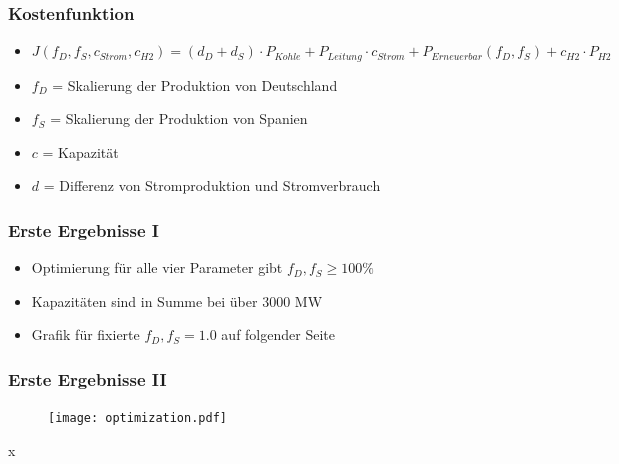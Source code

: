 \documentclass[aspectratio=169,t]{beamer}
\begin{document}
	\begin{frame}
		\frametitle{Kostenfunktion}
		\vspace*{2mm}
			\begin{minipage}{1\linewidth}
			\begin{minipage}{1\linewidth}
				\begin{itemize}
					\item \begin{math}
						J(f_D, f_S, c_{Strom}, c_{H2}) = (d_D + d_S) \cdot P_{Kohle} + P_{Leitung} \cdot c_{Strom} + P_{Erneuerbar}(f_D, f_S) + c_{H2} \cdot P_{H2}
					\end{math}
					\item 
					$	f_D$ = Skalierung der Produktion von Deutschland
					
					\item 
						$f_S$ = Skalierung der Produktion von Spanien
					\item 
					$	c$ = Kapazität
					\item 
					$	d$ = Differenz von Stromproduktion und  Stromverbrauch
				
					
				\end{itemize}
			\end{minipage}
			\hfill
			\begin{minipage}{.1\linewidth}
				\centering
				
			\end{minipage}
		\end{minipage}	
	
			
	\end{frame}


\begin{frame}
	\frametitle{Erste Ergebnisse I}
	\begin{itemize}
		\item Optimierung für alle vier Parameter gibt $f_D, f_S \geq 100\%$
		\item Kapazitäten sind in Summe bei über $3000$ MW
		\item Grafik für fixierte $f_D, f_S = 1.0$ auf folgender Seite
	\end{itemize}
	\vspace*{-2cm}
\end{frame}

\begin{frame}
	\frametitle{Erste Ergebnisse II}
	\vspace*{-1.6cm}
	\begin{figure}
		\hspace*{3.5cm}\texttt{[image: optimization.pdf]}
	\end{figure}x
\end{frame}
\end{document}
